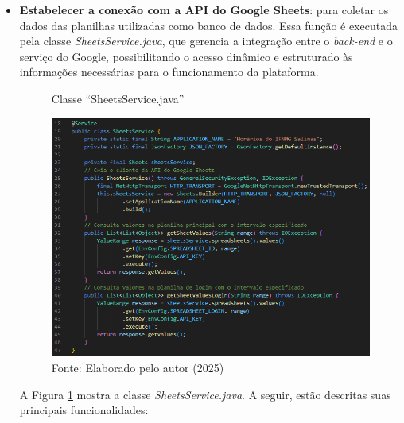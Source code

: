 \begin{itemize}
    \item \textbf{Estabelecer a conexão com a API do Google Sheets}: para coletar os dados das planilhas utilizadas como banco de dados. Essa função é executada pela classe \textit{SheetsService.java}, que gerencia a integração entre o \textit{back-end} e o serviço do Google, possibilitando o acesso dinâmico e estruturado às informações necessárias para o funcionamento da plataforma.
    
    \begin{figure}[H]
        \centering
        \caption{Classe ``SheetsService.java''}
        \includegraphics[width=1\textwidth]{Figuras/back-2.png}
        \caption*{Fonte: Elaborado pelo autor (2025)}
        \label{fig_back_2}
    \end{figure}
    
    A Figura \ref{fig_back_2} mostra a classe \textit{SheetsService.java}. A seguir, estão descritas suas principais funcionalidades:


\end{itemize}
